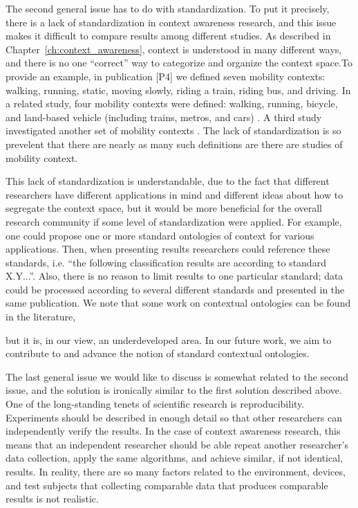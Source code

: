 The second general issue has to do with standardization. To put it precisely, there is a lack of standardization in context awareness research, and this issue makes it difficult to compare results among different studies. As described in Chapter~\ref{ch:context_awareness}, context is understood in many different ways, and there is no one ``correct'' way to categorize and organize the context space.To provide an example, in publication [P4] we defined seven mobility contexts: walking, running, static, moving slowly, riding a train, riding bus, and driving. In a related study, four mobility contexts were defined: walking, running, bicycle, and land-based vehicle (including trains, metros, and cars) \cite{elhoushi2014robust}. A third study investigated another set of mobility contexts \cite{stenneth2013detecting}. The lack of standardization is so prevelent that there are nearly as many such definitions are there are studies of mobility context.

This lack of standardization is understandable, due to the fact that different researchers have different applications in mind and different ideas about how to segregate the context space, but it would be more beneficial for the overall research community if some level of standardization were applied. For example, one could propose one or more standard ontologies of context for various applications. Then, when presenting results researchers could reference these standards, i.e. ``the following classification results are according to standard X.Y...''. Also, there is no reason to limit results to one particular standard; data could be processed according to several different standards and presented in the same publication. We note that some work on contextual ontologies can be found in the literature, %
%



but it is, in our view, an underdeveloped area. In our future work, we aim to contribute to and advance the notion of standard contextual ontologies.

The last general issue we would like to discuss is somewhat related to the second issue, and the solution is ironically similar to the first solution described above. One of the long-standing tenets of scientific research is reproducibility. Experiments should be described in enough detail so that other researchers can independently verify the results. In the case of context awareness research, this means that an independent researcher should be able repeat another researcher's data collection, apply the same algorithms, and achieve similar, if not identical, results. In reality, there are so many factors related to the environment, devices, and test subjects that collecting comparable data that produces comparable results is not realistic.

